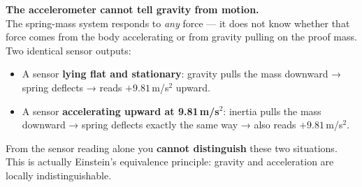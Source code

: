 \documentclass[12pt, a4paper]{article}
\begin{document}
\begin{warnbox}
  \textbf{The accelerometer cannot tell gravity from motion.}\\
  The spring-mass system responds to \emph{any} force --- it does not
  know whether that force comes from the body accelerating or from
  gravity pulling on the proof mass.\\[4pt]
  Two identical sensor outputs:
  \begin{itemize}[leftmargin=1.4em, topsep=2pt]
    \item A sensor \textbf{lying flat and stationary}: gravity pulls
          the mass downward → spring deflects → reads
          $+9.81$\,m/s$^2$ upward.
    \item A sensor \textbf{accelerating upward at 9.81\,m/s$^2$}:
          inertia pulls the mass downward → spring deflects exactly
          the same way → also reads $+9.81$\,m/s$^2$.
  \end{itemize}
  From the sensor reading alone you \textbf{cannot distinguish} these
  two situations.
  This is actually Einstein's equivalence principle: gravity and
  acceleration are locally indistinguishable.
\end{warnbox}
\end{document}
